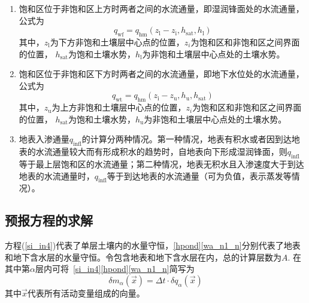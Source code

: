 \begin{enumerate}
  \item 饱和区位于非饱和区上方时两者之间的水流通量，即湿润锋面处的水流通量，公式为
    \begin{equation}
      q_{\mathrm{wf}}=q_{\mathrm{h m}}\left(z_{\mathrm{l}}-z_{\mathrm{i}}, h_{\mathrm{sat}}, h_{\mathrm{l}}\right)
    \end{equation}
    其中，$z_{\mathrm {l}} $为下方非饱和土壤层中心点的位置，$z_i$为饱和区和非饱和区之间界面的位置，
    $h_{\mathrm {sat}} $为饱和土壤水势，$h_{\mathrm {l}} $为非饱和土壤层中心点处的土壤水势。

  \item 饱和区位于非饱和区下方时两者之间的水流通量，即地下水位处的水流通量，公式为
    \begin{equation}
      q_{\mathrm{wt}}=q_{\mathrm{h m}}\left(z_{\mathrm{i}}-z_{\mathrm{u}}, h_{\mathrm{u}}, h_{\mathrm{sat}}\right)
    \end{equation}
    其中，$z_{\mathrm {u}} $为上方非饱和土壤层中心点的位置，$z_i$为饱和区和非饱和区之间界面的位置，
    $h_{\mathrm {sat}} $为饱和土壤水势，$h_{\mathrm {u}} $为非饱和土壤层中心点处的土壤水势。

  \item 地表入渗通量$q_{\mathrm{infl}}$的计算分两种情况。第一种情况，地表有积水或者因到达地表的水流通量较大而有形成积水的趋势时，自地表向下形成湿润锋面，则$q_{\mathrm{infl}}$等于最上层饱和区的水流通量；第二种情况，地表无积水且入渗速度大于到达地表的水流通量时，$q_{\mathrm{infl}}$等于到达地表的水流通量（可为负值，表示蒸发等情况）。

\end{enumerate}


\subsection{预报方程的求解}
方程(\ref{si_in4})代表了单层土壤内的水量守恒，\eqref{hpond}\eqref{wa_n1_n}分别代表了地表和地下含水层的水量守恒。令包含地表和地下含水层在内，总的计算层数为$A$. 在其中第$\alpha$层内可将~\eqref{si_in4}\eqref{hpond}\eqref{wa_n1_n}简写为
\begin{equation}\label{m_alpha_x}
  \delta m_{\alpha}(\vec{x})=\Delta t \cdot \delta q_{\alpha}(\vec{x})
\end{equation}
其中$\vec{x}$代表所有活动变量组成的向量。

